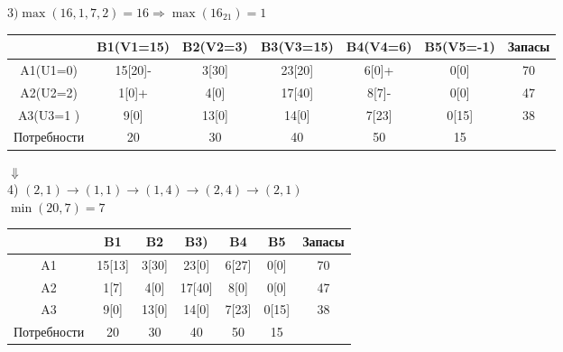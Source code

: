 \documentclass[a4paper, 12pt]{article}
\begin{document}
\begin{math}
  3) \max(16,1,7,2)= 16 \Rightarrow \max(16_{21}) = 1
\end{math}
\begin{table}[H]
\centering
\begin{tabular}{|c|c|c|c|c|c|c|}
\hline
            & B1(V1=15)& B2(V2=3) & B3(V3=15) & B4(V4=6)  & B5(V5=-1) & Запасы \\ \hline
A1(U1=0)    & 15[20]-  & 3[30]    & 23[20]    & 6[0]+     & 0[0]      & 70     \\ \hline
A2(U2=2)    & 1[0]+    & 4[0]     & 17[40]    & 8[7]-     & 0[0]      & 47     \\ \hline
A3(U3=1 )   & 9[0]     & 13[0]    & 14[0]     & 7[23]     & 0[15]     & 38     \\ \hline
Потребности & 20       & 30       & 40        & 50        & 15        &        \\ \hline
\end{tabular}
\end{table}

\begin{center}
  $\Downarrow$\\
  4) $(2,1)\rightarrow(1,1)\rightarrow(1,4)\rightarrow(2,4)\rightarrow(2,1)$\\
  $\min(20,7) = 7$
\end{center}
\begin{table}[H]
\centering
\begin{tabular}{|c|c|c|c|c|c|c|}
\hline
     & B1       & B2       & B3)       & B4        & B5        & Запасы \\ \hline
A1   & 15[13]   & 3[30]    & 23[0]     & 6[27]     & 0[0]      & 70     \\ \hline
A2   & 1[7]     & 4[0]     & 17[40]    & 8[0]      & 0[0]      & 47     \\ \hline
A3   & 9[0]     & 13[0]    & 14[0]     & 7[23]     & 0[15]     & 38     \\ \hline
Потребности & 20       & 30       & 40        & 50        & 15        &        \\ \hline
\end{tabular}
\end{table}
\end{document}
